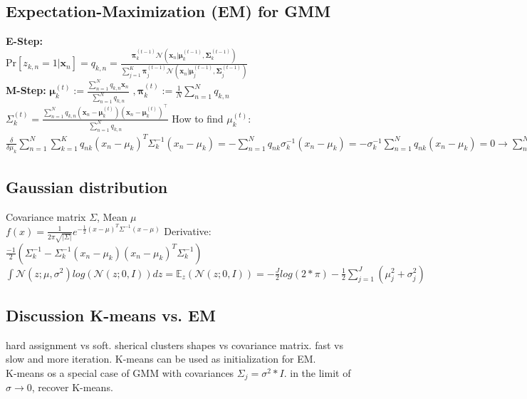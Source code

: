 \subsection*{Expectation-Maximization (EM) for GMM}
\textbf{E-Step: }\\
Pr$[z_{k,n} = 1 | \mathbf{x}_n] = q_{k, n} = \frac{\boldsymbol{\pi}_k^{(t-1)} \mathcal{N}(\mathbf{x}_n | \boldsymbol{\mu}_k^{(t-1)}, \boldsymbol{\Sigma}_k^{(t-1)})}{\sum_{j=1}^K \boldsymbol{\pi}_j^{(t-1)} \mathcal{N}(\mathbf{x}_n | \boldsymbol{\mu}_j^{(t-1)}, \boldsymbol{\Sigma}_j^{(t-1)})}$\\
\textbf{M-Step: } $\boldsymbol{\mu}_k^{(t)} := \frac{\sum_{n=1}^N q_{k,n} \mathbf{x}_n}{\sum_{n=1}^N q_{k,n}}$
$, \boldsymbol{\pi}_k^{(t)} := \frac{1}{N} \sum_{n=1}^N q_{k,n}$\\
$\Sigma_k^{(t)} = \frac{\sum_{n=1}^N q_{k, n} (\mathbf{x}_n - \boldsymbol{\mu}_k^{(t)})(\mathbf{x}_n - \boldsymbol{\mu}_k^{(t)})^\top}{\sum_{n=1}^N q_{k,n}}$
How to find $\mu_k^{(t)}$: $\frac{\delta}{\delta\mu_k}{\sum_{n=1}^N\sum_{k=1}^K q_{nk}(x_n-\mu_k)^T\Sigma_k^{-1}(x_n-\mu_k)} = -\sum_{n=1}^N q_{nk}\sigma_k^{-1} (x_n-\mu_k) = -\sigma_k^{-1}\sum_{n=1}^N q_{nk}(x_n-\mu_k) = 0 \rightarrow \sum_{n=1}^N q_{nk}(x_n-\mu_k)= 0 \rightarrow \mu_k = \frac{\sum_{n=1}^N q_{nk}x_n}{\sum_{n=1}^N q_{nk}}$

\subsection*{Gaussian distribution}
Covariance matrix $\Sigma$, Mean $\mu$ \\
$f(x) = \frac{1}{2\pi \sqrt{|\Sigma|}} e^{- \frac{1}{2} (x-\mu)^T \Sigma^{-1} (x-\mu)}$
Derivative: $\frac{-1}{2}(\Sigma_k^{-1}-\Sigma_k^{-1}(x_n-\mu_k)(x_n-\mu_k)^T\Sigma_k^{-1})$
$\int \mathcal{N}(z;\mu, \sigma^2)log(\mathcal{N}(z;0,I)) dz = \mathbb{E}_z (\mathcal{N}(z;0,I)) = -\frac{J}{2} log(2*\pi) - \frac{1}{2}\sum_{j=1}^J(\mu_j^2 + \sigma_j^2)$

\subsection*{Discussion K-means vs. EM}
hard assignment vs soft. sherical clusters shapes vs covariance matrix. fast vs slow and more iteration. K-means can be used as initialization for EM.\\
K-means os a special case of GMM with covariances $\Sigma_j = \sigma^2 * I$. in the limit of $\sigma \rightarrow 0$, recover K-means.

